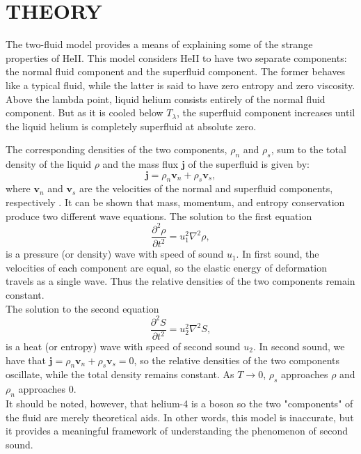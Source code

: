 \documentclass[prb,aps,twocolumn,showpacs,10pt]{revtex4-1}
\begin{document}
\section{THEORY}


The two-fluid model provides a means of explaining some of the strange properties of HeII. This model considers HeII to have two separate components: the normal fluid component and the superfluid component. The former behaves like a typical fluid, while the latter is said to have zero entropy and zero viscosity. Above the lambda point, liquid helium consists entirely of the normal fluid component. But as it is cooled below $T_\lambda$, the superfluid component increases until the liquid helium is completely superfluid at absolute zero.  


The corresponding densities of the two components, $\rho_n$ and $\rho_s$, sum to the total density of the liquid $\rho$ and the mass flux $\mathbf{j}$ of the superfluid is given by:
\begin{equation}
\mathbf{j}=\rho_n \mathbf{v}_n+\rho_s \mathbf{v}_s,
\end{equation}
where $\mathbf{v}_n$ and $\mathbf{v}_s$ are the velocities of the normal and superfluid components, respectively \cite{stanford}. It can be shown that mass, momentum, and entropy conservation produce two different wave equations. The solution to the first equation
\begin{equation}
\frac{\partial^2\rho}{\partial t^2} = u_1^2 \nabla^2 \rho,
\end{equation}
is a pressure (or density) wave with speed of sound $u_1$. In first sound, the velocities of each component are equal, so the elastic energy of deformation travels as a single wave. Thus the relative densities of the two components remain constant.\\

The solution to the second equation
\begin{equation}
\frac{\partial^2S}{\partial t^2} = u_2^2 \nabla^2 S,
\end{equation}
is a heat (or entropy) wave with speed of second sound $u_2$. In second sound, we have that $\mathbf{j}=\rho_n \mathbf{v}_n+\rho_s \mathbf{v}_s=0$, so the relative densities of the two components oscillate, while the total density remains constant\cite{stanford}. As $T\rightarrow 0$, $\rho_s$ approaches $\rho$ and $\rho_n$ approaches 0. \\

It should be noted, however, that helium-4  is a boson so the two "components" of the fluid are merely theoretical aids. In other words, this model is inaccurate, but it provides a meaningful framework of understanding the phenomenon of second sound. \\
\end{document}
